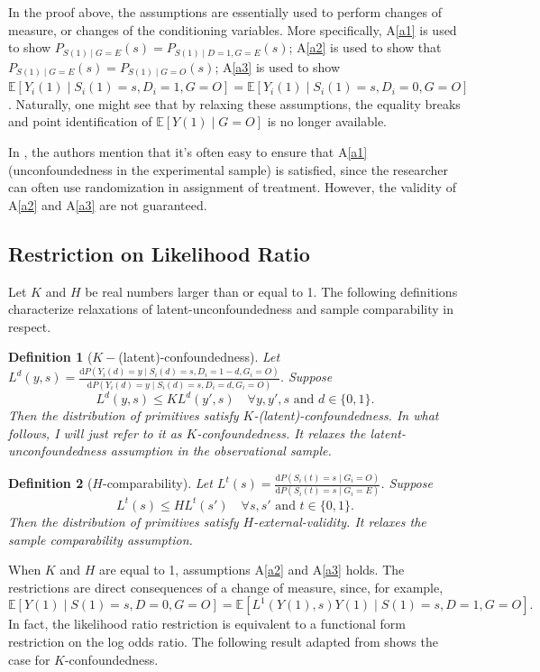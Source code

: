 \documentclass[12pt]{article}
\newtheorem{defn}{Definition}
\newcommand{\Ep}{\mathbb{E}}
\begin{document}
	In the proof above, the assumptions are essentially used to perform changes of measure, or changes of the conditioning variables. More specifically, A\ref{a1} is used to show $P_{S(1) \mid G = E}(s) = P_{S(1) \mid D = 1, G= E}(s)$; A\ref{a2} is used to show that $P_{S(1) \mid G = E}(s) = P_{S(1) \mid G = O}(s)$; A\ref{a3} is used to show $ \mathbb{E}[Y_i(1) \mid S_i(1) = s, D_i = 1, G = O] = \mathbb{E}[Y_i(1) \mid S_i(1) = s, D_i = 0, G = O]$. Naturally, one might see that by relaxing these assumptions, the equality breaks and point identification of $\Ep[Y(1) \mid G = O]$ is no longer available.
	
	In \textcite{athey2020combining}, the authors mention that it's often easy to ensure that A\ref{a1}(unconfoundedness in the experimental sample) is satisfied, since the researcher can often use randomization in assignment of treatment. However, the validity of A\ref{a2} and A\ref{a3} are not guaranteed.
	
	\subsection{Restriction on Likelihood Ratio}
	Let $K$ and $H$ be real numbers larger than or equal to 1. The following definitions characterize relaxations of latent-unconfoundedness and sample comparability in respect.
	
	\begin{defn}[$K-$(latent)-confoundedness] Let $L^d(y,s) = \frac{\mathrm{d} P(Y_i(d) = y \mid S_i(d) = s, D_i =1-d, G_i = O)}{\mathrm{d} P(Y_i(d) = y \mid S_i(d) = s, D_i = d, G_i = O)}$. Suppose $$L^d(y,s) \leq K L^d(y',s) \quad \forall y,y',s \text{ and } d\in\{0,1\}.$$ Then the distribution of primitives satisfy $K$-(latent)-confoundedness. In what follows, I will just refer to it as $K$-confoundedness. It relaxes the latent-unconfoundedness assumption in the observational sample.
	\end{defn}
	
	\begin{defn}[$H$-comparability]
	 Let $L^t(s) = \frac{\mathrm{d} P(S_i(t) = s \mid G_i = O)}{\mathrm{d} P(S_i(t) = s \mid G_i = E)}$. Suppose $$L^t(s) \leq H L^t(s') \quad \forall s,s' \text{ and } t \in \{0,1\}.$$ Then the distribution of primitives satisfy $H$-external-validity. It relaxes the sample comparability assumption.
	\end{defn}

	When $K$ and $H$ are equal to 1, assumptions A\ref{a2} and A\ref{a3} holds. The restrictions are direct consequences of a change of measure, since, for example, $$\Ep[Y(1) \mid S(1) = s, D = 0, G = O] = \Ep[L^1(Y(1),s) Y(1) \mid S(1) = s, D = 1, G = O].$$ In fact, the likelihood ratio restriction is equivalent to a functional form restriction on the log odds ratio. 
	The following result adapted from \textcite{yadlowsky2018bounds} shows the case for $K$-confoundedness.
	
\end{document}
